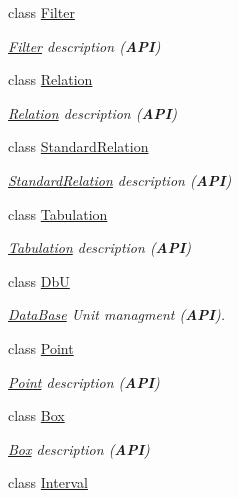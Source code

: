 \begin{DoxyCompactItemize}
class \hyperlink{classHurricane_1_1Filter}{Filter}
\begin{DoxyCompactList}\small\item\em \hyperlink{classHurricane_1_1Filter}{Filter} description ({\bfseries A\-P\-I}) \end{DoxyCompactList}\item 
class \hyperlink{classHurricane_1_1Relation}{Relation}
\begin{DoxyCompactList}\small\item\em \hyperlink{classHurricane_1_1Relation}{Relation} description ({\bfseries A\-P\-I}) \end{DoxyCompactList}\item 
class \hyperlink{classHurricane_1_1StandardRelation}{Standard\-Relation}
\begin{DoxyCompactList}\small\item\em \hyperlink{classHurricane_1_1StandardRelation}{Standard\-Relation} description ({\bfseries A\-P\-I}) \end{DoxyCompactList}\item 
class \hyperlink{classHurricane_1_1Tabulation}{Tabulation}
\begin{DoxyCompactList}\small\item\em \hyperlink{classHurricane_1_1Tabulation}{Tabulation} description ({\bfseries A\-P\-I}) \end{DoxyCompactList}\item 
class \hyperlink{classHurricane_1_1DbU}{Db\-U}
\begin{DoxyCompactList}\small\item\em \hyperlink{classHurricane_1_1DataBase}{Data\-Base} Unit managment ({\bfseries A\-P\-I}). \end{DoxyCompactList}\item 
class \hyperlink{classHurricane_1_1Point}{Point}
\begin{DoxyCompactList}\small\item\em \hyperlink{classHurricane_1_1Point}{Point} description ({\bfseries A\-P\-I}) \end{DoxyCompactList}\item 
class \hyperlink{classHurricane_1_1Box}{Box}
\begin{DoxyCompactList}\small\item\em \hyperlink{classHurricane_1_1Box}{Box} description ({\bfseries A\-P\-I}) \end{DoxyCompactList}\item 
class \hyperlink{classHurricane_1_1Interval}{Interval}

\end{DoxyCompactItemize}
